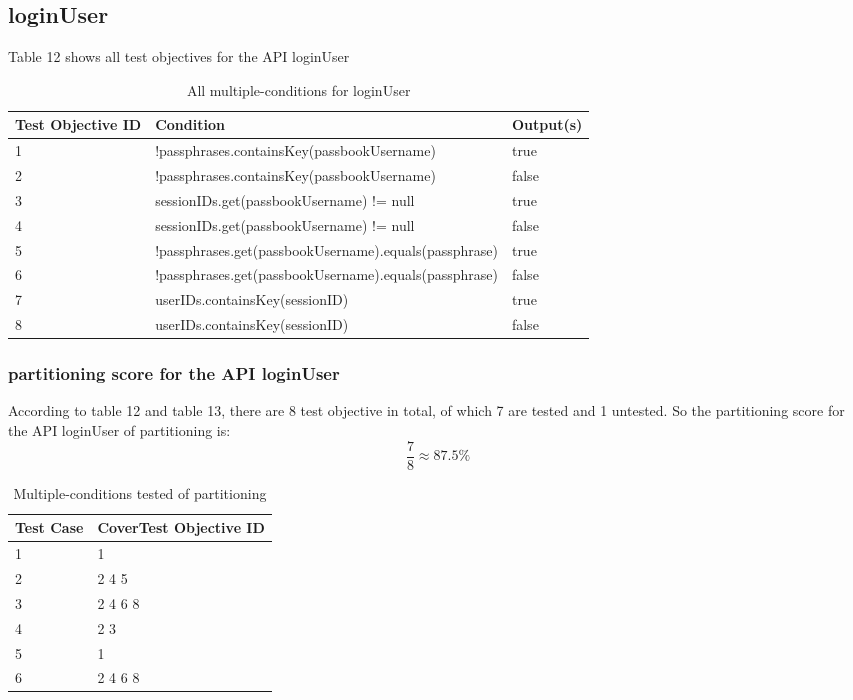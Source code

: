 \documentclass{article}
\begin{document}
\subsection{loginUser}
Table 12 shows all test objectives for the API loginUser
\begin{longtable}{|p{2cm}|p{10cm}|p{3cm}|}
\caption{All multiple-conditions for loginUser}\\
\hline 
Test Objective ID&Condition&Output(s)\\
\hline  
1&!passphrases.containsKey(passbookUsername)&true\\
\hline
2&!passphrases.containsKey(passbookUsername)&false\\
\hline
3&sessionIDs.get(passbookUsername) != null&true\\
\hline
4&sessionIDs.get(passbookUsername) != null&false\\
\hline
5&!passphrases.get(passbookUsername).equals(passphrase)&true\\
\hline
6&!passphrases.get(passbookUsername).equals(passphrase)&false\\
\hline
7&userIDs.containsKey(sessionID)&true\\
\hline
8&userIDs.containsKey(sessionID)&false\\
\hline
\end{longtable}

\subsubsection{partitioning score for the API loginUser}
According to table 12 and table 13, there are 8 test objective in total, of which 7 are tested and 1 untested. So the partitioning score for the API loginUser of partitioning is:
$$\frac{7}{8}\approx87.5\%$$
\begin{longtable}{|p{2cm}|p{8cm}|}
\caption{Multiple-conditions tested of partitioning}\\
\hline 
Test Case& CoverTest Objective ID\\
\hline  
1&1\\
\hline
2&2 4 5\\
\hline
3&2 4 6 8\\
\hline
4&2 3\\
\hline
5&1\\
\hline
6&2 4 6 8\\
\hline
\end{longtable}

\end{document}
